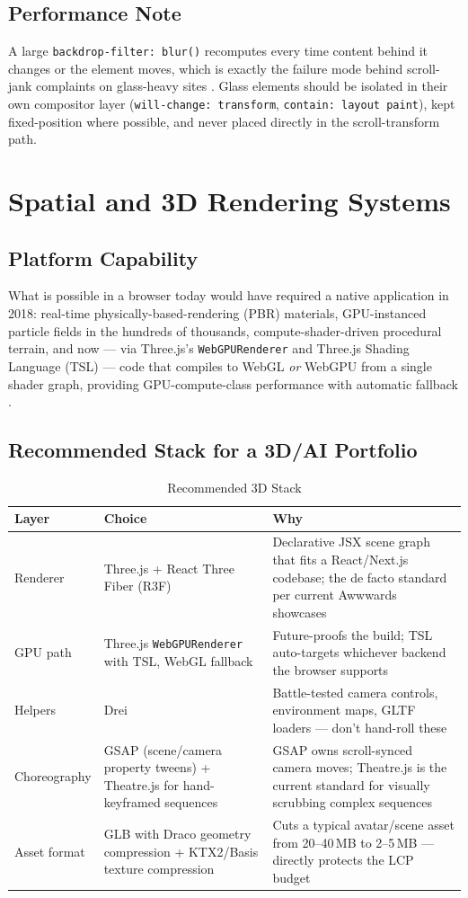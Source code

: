 \documentclass[conference]{IEEEtran}
\begin{document}
\subsection{Performance Note}
A large \texttt{backdrop-filter: blur()} recomputes every time content behind it changes or the element moves, which is exactly the failure mode behind scroll-jank complaints on glass-heavy sites \cite{logrocket_glass}. Glass elements should be isolated in their own compositor layer (\texttt{will-change: transform}, \texttt{contain: layout paint}), kept fixed-position where possible, and never placed directly in the scroll-transform path.

\section{Spatial and 3D Rendering Systems}

\subsection{Platform Capability}
What is possible in a browser today would have required a native application in 2018: real-time physically-based-rendering (PBR) materials, GPU-instanced particle fields in the hundreds of thousands, compute-shader-driven procedural terrain, and now --- via Three.js's \texttt{WebGPURenderer} and Three.js Shading Language (TSL) --- code that compiles to WebGL \emph{or} WebGPU from a single shader graph, providing GPU-compute-class performance with automatic fallback \cite{threejs_resources}.

\subsection{Recommended Stack for a 3D/AI Portfolio}
\begin{table}[h]
\centering
\caption{Recommended 3D Stack}
\label{tab:3dstack_full}
\begin{tabular}{L{1.5cm}L{2.6cm}L{3.9cm}}
\toprule
\textbf{Layer} & \textbf{Choice} & \textbf{Why} \\
\midrule
Renderer & Three.js + React Three Fiber (R3F) & Declarative JSX scene graph that fits a React/Next.js codebase; the de facto standard per current Awwwards showcases \\
GPU path & Three.js \texttt{WebGPURenderer} with TSL, WebGL fallback & Future-proofs the build; TSL auto-targets whichever backend the browser supports \\
Helpers & Drei & Battle-tested camera controls, environment maps, GLTF loaders --- don't hand-roll these \\
Choreography & GSAP (scene/camera property tweens) + Theatre.js for hand-keyframed sequences & GSAP owns scroll-synced camera moves; Theatre.js is the current standard for visually scrubbing complex sequences \\
Asset format & GLB with Draco geometry compression + KTX2/Basis texture compression & Cuts a typical avatar/scene asset from 20--40\,MB to 2--5\,MB --- directly protects the LCP budget \\
\bottomrule
\end{tabular}
\end{table}
\end{document}
